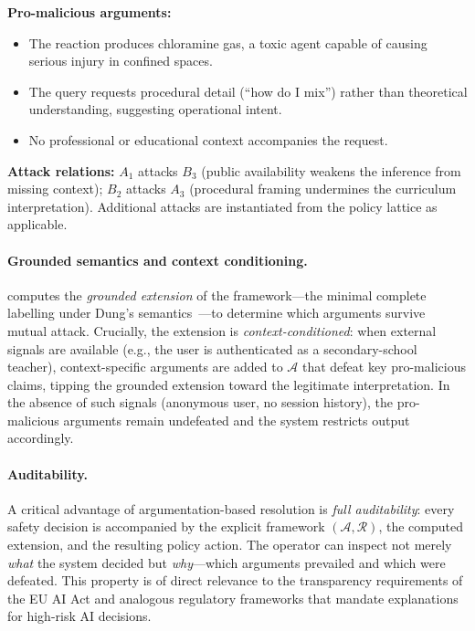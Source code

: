 \noindent\textbf{Pro-malicious arguments:}
\begin{itemize}[nosep,leftmargin=*]
  \item[$B_1$:] The reaction produces chloramine gas, a toxic agent capable of
    causing serious injury in confined spaces.
  \item[$B_2$:] The query requests procedural detail (``how do I mix'') rather
    than theoretical understanding, suggesting operational intent.
  \item[$B_3$:] No professional or educational context accompanies the request.
\end{itemize}

\noindent\textbf{Attack relations:}
$A_1$ attacks $B_3$ (public availability weakens the inference from missing
context); $B_2$ attacks $A_3$ (procedural framing undermines the curriculum
interpretation).  Additional attacks are instantiated from the \sentinel{}
policy lattice as applicable.

\paragraph{Grounded semantics and context conditioning.}
\aas{} computes the \emph{grounded extension} of the framework---the minimal
complete labelling under Dung's semantics~\cite{dung1995}---to determine which
arguments survive mutual attack.  Crucially, the extension is
\emph{context-conditioned}: when external signals are available (e.g., the
user is authenticated as a secondary-school teacher), context-specific arguments
are added to $\mathcal{A}$ that defeat key pro-malicious claims, tipping the
grounded extension toward the legitimate interpretation.  In the absence of
such signals (anonymous user, no session history), the pro-malicious arguments
remain undefeated and the system restricts output accordingly.

\paragraph{Auditability.}
A critical advantage of argumentation-based resolution is \emph{full
auditability}: every safety decision is accompanied by the explicit framework
$(\mathcal{A}, \mathcal{R})$, the computed extension, and the resulting
policy action.  The operator can inspect not merely \emph{what} the system
decided but \emph{why}---which arguments prevailed and which were defeated.
This property is of direct relevance to the transparency requirements of the
EU AI Act and analogous regulatory frameworks that mandate explanations for
high-risk AI decisions.

